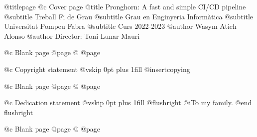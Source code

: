 @titlepage
@c Cover page
@title Pronghorn: A fast and simple CI/CD pipeline
@subtitle Treball Fi de Grau
@subtitle Grau en Enginyeria Informàtica
@subtitle Universitat Pompeu Fabra
@subtitle Curs 2022-2023
@author Wasym Atieh Alonso
@author Director: Toni Lunar Mauri

@c Blank page
@page
@
@page

@c Copyright statement
@vskip 0pt plus 1fill
@insertcopying

@c Blank page
@page
@
@page

@c Dedication statement
@vskip 0pt plus 1fill
@flushright
@i{To my family.}
@end flushright

@c Blank page
@page
@
@page
